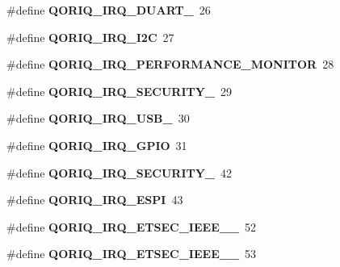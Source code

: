 \begin{DoxyCompactItemize}
\#define {\bfseries Q\+O\+R\+I\+Q\+\_\+\+I\+R\+Q\+\_\+\+D\+U\+A\+R\+T\+\_}~26
\item 
\mbox{\label{group__QoriqInterruptAll_ga4b3286ac55a8e8724c14229e42835329}} 
\#define {\bfseries Q\+O\+R\+I\+Q\+\_\+\+I\+R\+Q\+\_\+\+I2C}~27
\item 
\mbox{\label{group__QoriqInterruptAll_ga7ae77b5b4a9b157508681cff23685705}} 
\#define {\bfseries Q\+O\+R\+I\+Q\+\_\+\+I\+R\+Q\+\_\+\+P\+E\+R\+F\+O\+R\+M\+A\+N\+C\+E\+\_\+\+M\+O\+N\+I\+T\+OR}~28
\item 
\mbox{\label{group__QoriqInterruptAll_ga26c3f3f6c44ce8a573d0dd2386999f88}} 
\#define {\bfseries Q\+O\+R\+I\+Q\+\_\+\+I\+R\+Q\+\_\+\+S\+E\+C\+U\+R\+I\+T\+Y\+\_}~29
\item 
\mbox{\label{group__QoriqInterruptAll_ga273af1eda6d82c4450dffa9ab45c9ab9}} 
\#define {\bfseries Q\+O\+R\+I\+Q\+\_\+\+I\+R\+Q\+\_\+\+U\+S\+B\+\_}~30
\item 
\mbox{\label{group__QoriqInterruptAll_ga3977f083d580a163b2dc9bd3a5b135f2}} 
\#define {\bfseries Q\+O\+R\+I\+Q\+\_\+\+I\+R\+Q\+\_\+\+G\+P\+IO}~31
\item 
\mbox{\label{group__QoriqInterruptAll_gaaff61f30ead89be43a310c7fa55bacb9}} 
\#define {\bfseries Q\+O\+R\+I\+Q\+\_\+\+I\+R\+Q\+\_\+\+S\+E\+C\+U\+R\+I\+T\+Y\+\_}~42
\item 
\mbox{\label{group__QoriqInterruptAll_ga7257e66deec95e144d7d9c1176877483}} 
\#define {\bfseries Q\+O\+R\+I\+Q\+\_\+\+I\+R\+Q\+\_\+\+E\+S\+PI}~43
\item 
\mbox{\label{group__QoriqInterruptAll_gafee33582131c5fcc78aca4be622fef46}} 
\#define {\bfseries Q\+O\+R\+I\+Q\+\_\+\+I\+R\+Q\+\_\+\+E\+T\+S\+E\+C\+\_\+\+I\+E\+E\+E\+\_\+\_}~52
\item 
\mbox{\label{group__QoriqInterruptAll_gaed62300cd6ed96ad3f5200956f892204}} 
\#define {\bfseries Q\+O\+R\+I\+Q\+\_\+\+I\+R\+Q\+\_\+\+E\+T\+S\+E\+C\+\_\+\+I\+E\+E\+E\+\_\+\_}~53

\end{DoxyCompactItemize}
